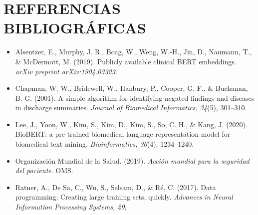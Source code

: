 
\chapter*{REFERENCIAS BIBLIOGRÁFICAS}


\begin{itemize}
    \item Alsentzer, E., Murphy, J. R., Boag, W., Weng, W.-H., Jin, D., Naumann, T., \& McDermott, M. (2019). Publicly available clinical BERT embeddings. \textit{arXiv preprint arXiv:1904.03323}.

    \item Chapman, W. W., Bridewell, W., Hanbury, P., Cooper, G. F., \& Buchanan, B. G. (2001). A simple algorithm for identifying negated findings and diseases in discharge summaries. \textit{Journal of Biomedical Informatics, 34}(5), 301--310.

    \item Lee, J., Yoon, W., Kim, S., Kim, D., Kim, S., So, C. H., \& Kang, J. (2020). BioBERT: a pre-trained biomedical language representation model for biomedical text mining. \textit{Bioinformatics, 36}(4), 1234--1240.

    \item Organización Mundial de la Salud. (2019). \textit{Acción mundial para la seguridad del paciente}. OMS.

    \item Ratner, A., De Sa, C., Wu, S., Selsam, D., \& Ré, C. (2017). Data programming: Creating large training sets, quickly. \textit{Advances in Neural Information Processing Systems, 29}.
\end{itemize}
